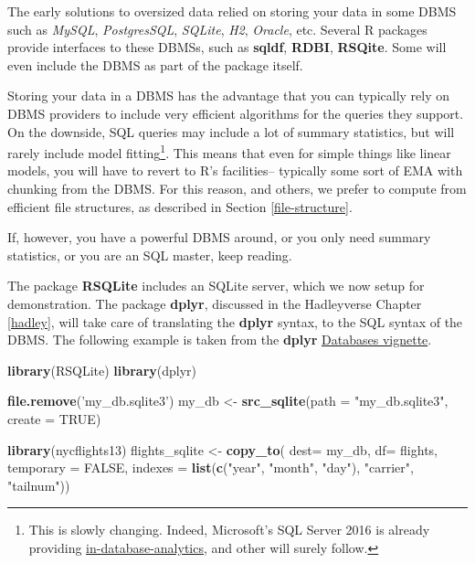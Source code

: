 \documentclass[]{book}
\newenvironment{Shaded}{\begin{snugshade}}{\end{snugshade}}
\newcommand{\KeywordTok}[1]{\textcolor[rgb]{0.13,0.29,0.53}{\textbf{#1}}}
\newcommand{\DataTypeTok}[1]{\textcolor[rgb]{0.13,0.29,0.53}{#1}}
\newcommand{\StringTok}[1]{\textcolor[rgb]{0.31,0.60,0.02}{#1}}
\newcommand{\OtherTok}[1]{\textcolor[rgb]{0.56,0.35,0.01}{#1}}
\newcommand{\NormalTok}[1]{#1}
\theoremstyle{definition}
\theoremstyle{definition}
\theoremstyle{definition}
\theoremstyle{remark}
\begin{document}
The early solutions to oversized data relied on storing your data in
some DBMS such as \emph{MySQL}, \emph{PostgresSQL}, \emph{SQLite},
\emph{H2}, \emph{Oracle}, etc. Several R packages provide interfaces to
these DBMSs, such as \textbf{sqldf}, \textbf{RDBI}, \textbf{RSQite}.
Some will even include the DBMS as part of the package itself.

Storing your data in a DBMS has the advantage that you can typically
rely on DBMS providers to include very efficient algorithms for the
queries they support. On the downside, SQL queries may include a lot of
summary statistics, but will rarely include model fitting\footnote{This
  is slowly changing. Indeed, Microsoft's SQL Server 2016 is already
  providing
  \href{https://blogs.technet.microsoft.com/dataplatforminsider/2016/03/29/in-database-advanced-analytics-with-r-in-sql-server-2016/}{in-database-analytics},
  and other will surely follow.}. This means that even for simple things
like linear models, you will have to revert to R's facilities--
typically some sort of EMA with chunking from the DBMS. For this reason,
and others, we prefer to compute from efficient file structures, as
described in Section \ref{file-structure}.

If, however, you have a powerful DBMS around, or you only need summary
statistics, or you are an SQL master, keep reading.

The package \textbf{RSQLite} includes an SQLite server, which we now
setup for demonstration. The package \textbf{dplyr}, discussed in the
Hadleyverse Chapter \ref{hadley}, will take care of translating the
\textbf{dplyr} syntax, to the SQL syntax of the DBMS. The following
example is taken from the \textbf{dplyr}
\href{https://cran.r-project.org/web/packages/dplyr/vignettes/databases.html}{Databases
vignette}.

\begin{Shaded}
\begin{Highlighting}[]
\KeywordTok{library}\NormalTok{(RSQLite)}
\KeywordTok{library}\NormalTok{(dplyr)}

\KeywordTok{file.remove}\NormalTok{(}\StringTok{'my_db.sqlite3'}\NormalTok{)}
\NormalTok{my_db <-}\StringTok{ }\KeywordTok{src_sqlite}\NormalTok{(}\DataTypeTok{path =} \StringTok{"my_db.sqlite3"}\NormalTok{, }\DataTypeTok{create =} \OtherTok{TRUE}\NormalTok{)}

\KeywordTok{library}\NormalTok{(nycflights13)}
\NormalTok{flights_sqlite <-}\StringTok{ }\KeywordTok{copy_to}\NormalTok{(}
  \DataTypeTok{dest=}\NormalTok{ my_db, }
  \DataTypeTok{df=}\NormalTok{ flights, }
  \DataTypeTok{temporary =} \OtherTok{FALSE}\NormalTok{, }
  \DataTypeTok{indexes =} \KeywordTok{list}\NormalTok{(}\KeywordTok{c}\NormalTok{(}\StringTok{"year"}\NormalTok{, }\StringTok{"month"}\NormalTok{, }\StringTok{"day"}\NormalTok{), }\StringTok{"carrier"}\NormalTok{, }\StringTok{"tailnum"}\NormalTok{))}
\end{Highlighting}
\end{Shaded}
\end{document}
